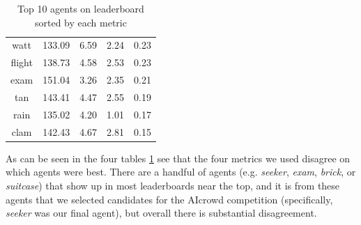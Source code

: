 \begin{table}[H]
{\begin{tabular}{|| c | c | c | c | c ||}
     watt &     133.09 &  6.59 &    2.24 &           0.23 \\
   flight &     138.73 &  4.58 &    2.53 &           0.23 \\
     exam &     151.04 &  3.26 &    2.35 &           0.21 \\
      tan &     143.41 &  4.47 &    2.55 &           0.19 \\
     rain &     135.02 &  4.20 &    1.01 &           0.17 \\
     clam &     142.43 &  4.67 &    2.81 &           0.15 \\[1ex] 
 \hline
\end{tabular}
}
\caption{Top 10 agents on leaderboard sorted by each metric}
\label{TableTopAgentsMetrics}
\end{table}

As can be seen in the four tables \ref{TableTopAgentsMetrics} see that the four metrics we used disagree on which agents were best. There are a handful of agents (e.g. \textit{seeker}, \textit{exam}, \textit{brick}, or \textit{suitcase}) that show up in most leaderboards near the top, and it is from these agents that we selected candidates for the AIcrowd competition (specifically, \textit{seeker} was our final agent), but overall there is substantial disagreement.

